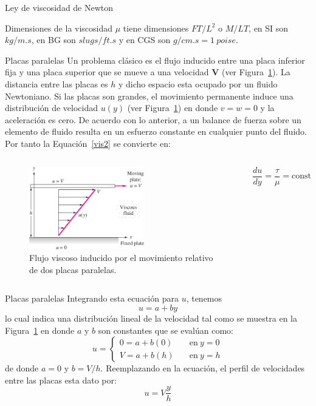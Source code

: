 \documentclass [xcolor=svgnames, t] {beamer}
\begin{document}
\begin{frame}{Ley de viscosidad de Newton}
\begin{block}{Dimensiones de la viscosidad}
$\mu$ tiene dimensiones ${FT/L^2}$ o ${M/LT}$, en SI son $kg/m.s$, en BG son $slugs/ft.s$ y en CGS son $g/cm.s = 1\ poise$. 
\end{block}
\end{frame}

\begin{frame}{Placas paralelas}
\vspace{-0.4cm}
Un problema  cl\'asico es el flujo inducido entre una placa inferior fija y una placa superior que se mueve a una velocidad $\mathbf{V}$ (ver Figura~\ref{pla}). La distancia entre las placas es $h$ y dicho espacio esta ocupado por un fluido Newtoniano. Si las placas son grandes, el movimiento permanente induce una distribuci\'on de velocidad $u(y)$  (ver Figura~\ref{pla}) en donde $v=w=0$ y la aceleraci\'on es cero. De acuerdo con lo anterior, a un balance de fuerza sobre un elemento de fluido resulta en un esfuerzo constante en cualquier punto del fluido. Por tanto la Equaci\'on~\ref{vis2} se convierte en:

\begin{columns}
\begin{figure}[h]
\centering
\includegraphics[width=5cm]{plate}
\caption{Flujo viscoso inducido por el movimiento relativo de dos placas paralelas.}
\label{pla}
\end{figure}

$$
\frac{du}{dy}=\frac{\tau}{\mu}=\text{const}
$$
\end{columns}
\end{frame}

\begin{frame}{Placas paralelas}
Integrando esta ecuaci\'on para $u$, tenemos
$$
u=a+by
$$
lo cual indica una distribuci\'on lineal de la velocidad tal como se muestra en la Figura~\ref{pla} en donde $a$ y $b$ son constantes que se eval\'uan como:
$$
u= 
\begin{cases}
0 = a+b(0) & \quad \text{en}\ y=0 \\
V = a+b(h) & \quad \text{en}\ y=h 
\end{cases}
$$
de donde $a=0$ y $b=V/h$. Reemplazando en la ecuaci\'on, el perfil de velocidades entre las placas esta dato por:
\begin{equation}
u=V\frac{y}{h}
\label{upl}
\end{equation}
\end{frame}
\end{document}
